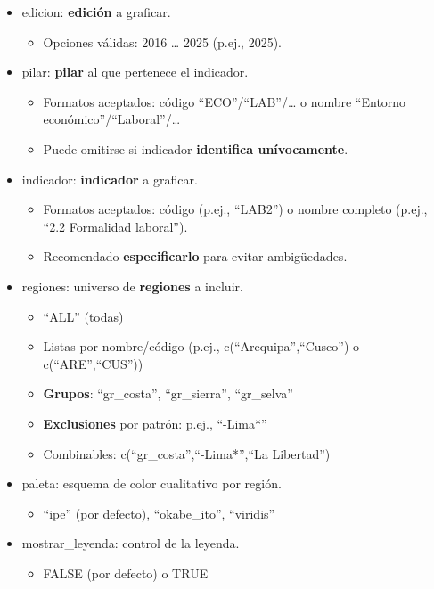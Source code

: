 \documentclass[
  11pt,
  letterpaper,
  DIV=11,
  numbers=noendperiod]{scrartcl}
\providecommand{\tightlist}{%
  \setlength{\itemsep}{0pt}\setlength{\parskip}{0pt}}\usepackage{longtable,booktabs,array}
\begin{document}
\begin{itemize}
\item
  edicion: \textbf{edición} a graficar.

  \begin{itemize}
  \tightlist
  \item
    Opciones válidas: 2016 \ldots{} 2025 (p.ej., 2025).
  \end{itemize}
\item
  pilar: \textbf{pilar} al que pertenece el indicador.

  \begin{itemize}
  \item
    Formatos aceptados: código ``ECO''/``LAB''/\ldots{} o nombre
    ``Entorno económico''/``Laboral''/\ldots{}
  \item
    Puede omitirse si indicador \textbf{identifica unívocamente}.
  \end{itemize}
\item
  indicador: \textbf{indicador} a graficar.

  \begin{itemize}
  \item
    Formatos aceptados: código (p.ej., ``LAB2'') o nombre completo
    (p.ej., ``2.2 Formalidad laboral'').
  \item
    Recomendado \textbf{especificarlo} para evitar ambigüedades.
  \end{itemize}
\item
  regiones: universo de \textbf{regiones} a incluir.

  \begin{itemize}
  \item
    ``ALL'' (todas)
  \item
    Listas por nombre/código (p.ej., c(``Arequipa'',``Cusco'') o
    c(``ARE'',``CUS''))
  \item
    \textbf{Grupos}: ``gr\_costa'', ``gr\_sierra'', ``gr\_selva''
  \item
    \textbf{Exclusiones} por patrón: p.ej., ``-Lima*''
  \item
    Combinables: c(``gr\_costa'',``-Lima*'',``La Libertad'')
  \end{itemize}
\item
  paleta: esquema de color cualitativo por región.

  \begin{itemize}
  \tightlist
  \item
    ``ipe'' (por defecto), ``okabe\_ito'', ``viridis''
  \end{itemize}
\item
  mostrar\_leyenda: control de la leyenda.

  \begin{itemize}
  \tightlist
  \item
    FALSE (por defecto) o TRUE
  \end{itemize}
\end{itemize}
\end{document}
